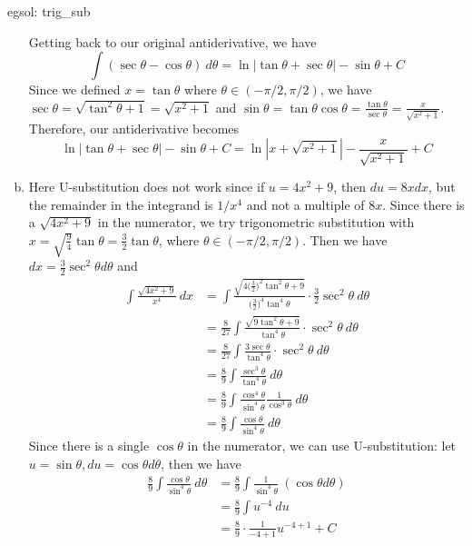 \begin{egsol}[]{egsol: trig_sub}
\begin{enumerate}[a)]
            Getting back to our original antiderivative, we have
            \[\int (\sec \theta - \cos\theta)~d\theta = \ln|\tan \theta + \sec \theta| - \sin \theta + C\]
            Since we defined $x = \tan \theta$ where $\theta \in (-\pi/2, \pi/2)$, we have $\sec \theta = \sqrt{\tan^2\theta + 1} = \sqrt{x^2+1}$ and $\sin \theta = \tan \theta \cos \theta = \frac{\tan \theta}{\sec \theta} = \frac{x}{\sqrt{x^2+1}}$.  Therefore, our antiderivative becomes
            \[\ln|\tan \theta + \sec \theta| - \sin \theta + C = \ln|x + \sqrt{x^2+1}| - \frac{x}{\sqrt{x^2+1}} + C\]
            \item Here U-substitution does not work since if $u = 4x^2+9$, then $du = 8xdx$, but the remainder in the integrand is $1/x^4$ and not a multiple of $8x$.  Since there is a $\sqrt{4x^2 + 9}$ in the numerator, we try trigonometric substitution with $x = \sqrt{\frac{9}{4}}\tan \theta = \frac{3}{2}\tan \theta$, where $\theta \in (-\pi/2, \pi/2)$.  Then we have $dx = \frac{3}{2}\sec^2\theta d\theta$ and 
            \begin{align*}
                \int \frac{\sqrt{4x^2 + 9}}{x^4}~dx &= \int \frac{\sqrt{4\big(\frac{3}{2}\big)^2\tan^2\theta + 9}}{\big(\frac{3}{2}\big)^4\tan^4\theta}\cdot \frac{3}{2}\sec^2\theta~d\theta\\
                &= \frac{8}{27}\int \frac{\sqrt{9\tan^2\theta + 9}}{\tan^4\theta}\cdot \sec^2\theta~d\theta\\
                &= \frac{8}{27}\int \frac{3\sec \theta}{\tan^4\theta}\cdot \sec^2\theta~d\theta\\
                &= \frac{8}{9}\int \frac{\sec^3 \theta}{\tan^4\theta}~d\theta\\
                &= \frac{8}{9}\int \frac{\cos^4 \theta}{\sin^4\theta}\frac{1}{\cos^3 \theta}~d\theta\\
                &= \frac{8}{9}\int \frac{\cos\theta}{\sin^4\theta}~d\theta
            \end{align*}
            Since there is a single $\cos \theta$ in the numerator, we can use U-substitution: let $u = \sin\theta, du=\cos\theta d\theta$, then we have
            \begin{align*}
                \frac{8}{9}\int \frac{\cos\theta}{\sin^4\theta}~d\theta &= \frac{8}{9}\int \frac{1}{\sin^4\theta}~(\cos\theta d\theta)\\
                &=\frac{8}{9}\int u^{-4}~du\\
                &=\frac{8}{9}\cdot\frac{1}{-4+1}u^{-4+1} + C\\

\end{align*}
\end{enumerate}
\end{egsol}
